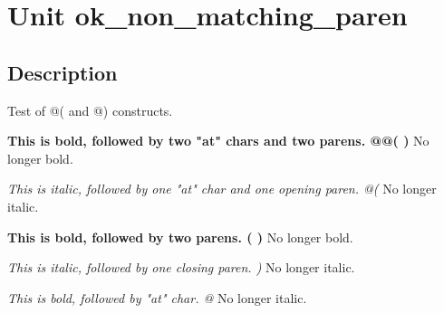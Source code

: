 \documentclass{report}
\begin{document}
\label{toc}\tableofcontents
\newpage
\newlength{\tmplength}
\chapter{Unit ok{\_}non{\_}matching{\_}paren}
\label{ok_non_matching_paren}
\section{Description}
Test of @( and @) constructs.\hfill\vspace*{1ex}



\textbf{This is bold, followed by two "at" chars and two parens. @@( ) } No longer bold.

\textit{This is italic, followed by one "at" char and one opening paren. @( } No longer italic.

\textbf{This is bold, followed by two parens. ( ) } No longer bold.

\textit{This is italic, followed by one closing paren. ) } No longer italic.

\textit{This is bold, followed by "at" char. @} No longer italic.
\end{document}
